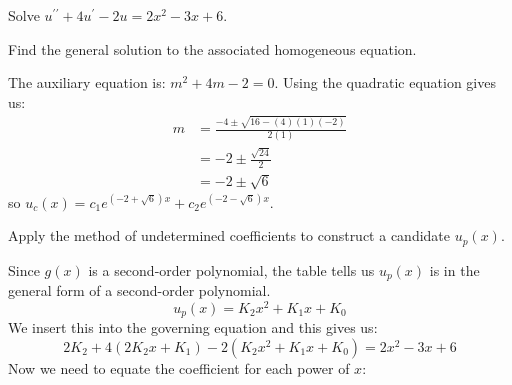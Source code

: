 \vspace{0.5cm}

 Solve $u^{\prime \prime}+4u^{\prime}-2u = 2x^2 - 3x + 6$.

\vspace{0.25cm}
 Find the general solution to the associated homogeneous equation.

\vspace{0.25cm}

\noindent The auxiliary equation is: $m^2 + 4m-2=0$.  Using the quadratic equation gives us: 
\begin{align*}
m &= \frac{-4 \pm \sqrt{16 - (4)(1)(-2)}}{2(1)} \\
&= -2 \pm \frac{\sqrt{24}}{2} \\
&= -2 \pm \sqrt{6}
\end{align*}
so $u_c(x) = c_1e^{(-2+\sqrt{6})x}+c_2e^{(-2-\sqrt{6})x}$.

\vspace{3.0cm}
 Apply the method of undetermined coefficients to construct a candidate $u_p(x)$.

\vspace{0.25cm}

\noindent Since $g(x)$ is a second-order polynomial, the table tells us $u_p(x)$ is in the general form of a second-order polynomial.
$$u_p(x) = K_2x^2+K_1x+K_0$$
We insert this into the governing equation and this gives us:
\begin{equation*}
2K_2 + 4(2K_2x+K_1) - 2(K_2x^2+K_1x+K_0) = 2x^2-3x+6
\end{equation*}
Now we need to equate the coefficient for each power of $x$:

